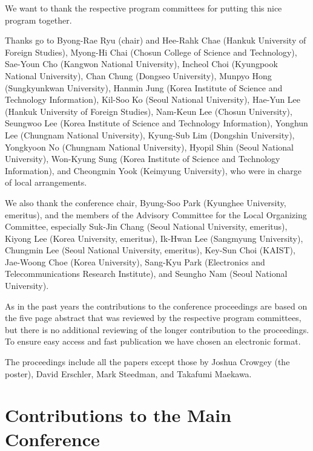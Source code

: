 \documentclass[11pt,a4paper,fleqn]{article}
\begin{document}
We want to thank the respective program committees for putting this nice program together.



Thanks go to Byong-Rae Ryu (chair) and Hee-Rahk Chae (Hankuk University of Foreign Studies),
Myong-Hi Chai (Chosun College of Science and Technology), Sae-Youn Cho (Kangwon National
University), Incheol Choi (Kyungpook National University), Chan Chung (Dongseo University), Munpyo
Hong (Sung\-kyun\-kwan University), Hanmin Jung (Korea Institute of Science and Technology Information),
Kil-Soo Ko (Seoul National University), Hae-Yun Lee (Hankuk University of Foreign Studies), Nam-Keun
Lee (Chosun University), Seungwoo Lee (Korea Institute of Science and Technology Information),
Yonghun Lee (Chungnam National University), Kyung-Sub Lim (Dongshin University), Yongkyoon No
(Chungnam National University), Hyopil Shin (Seoul National University), Won-Kyung Sung (Korea
Institute of Science and Technology Information), and Cheongmin Yook (Keimyung University), who were
in charge of local arrangements.
 
We also thank the conference chair, Byung-Soo Park (Kyunghee University, emeritus), and the members
of the Advisory Committee for the Local Organizing Committee, especially Suk-Jin Chang (Seoul
National University, emeritus), Kiyong Lee (Korea University, emeritus), Ik-Hwan Lee (Sangmyung
University), Chungmin Lee (Seoul National University, emeritus), Key-Sun Choi (KAIST), Jae-Woong
Choe (Korea University), Sang-Kyu Park (Electronics and Telecommunications Research Institute), and
Seungho Nam (Seoul National University).


As in the past years the contributions to the conference proceedings are based on the five page abstract
that was reviewed by the respective program committees, but there is no additional reviewing of the
longer contribution to the proceedings.
To ensure easy access and fast publication we have chosen an electronic format.

The proceedings include all the papers except those by Joshua Crowgey (the poster), David Erschler, Mark Steedman, and Takafumi Maekawa.


\newpage
\part{Contributions to the Main Conference}
\thispagestyle{empty}
\newpage
        \setcounter{page}{6}
\thispagestyle{empty}
\end{document}
